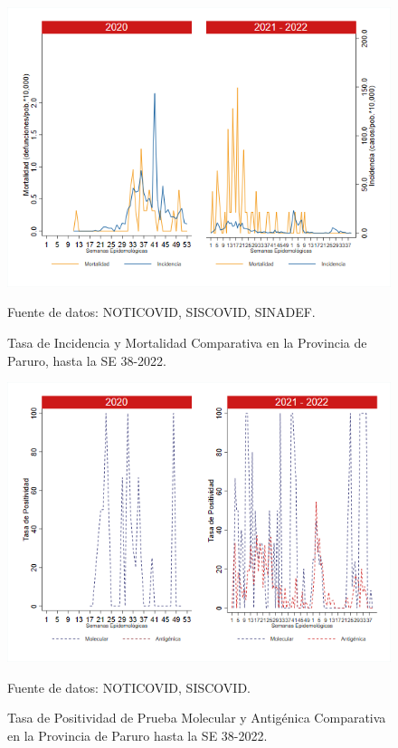 \documentclass[12pt,a4paper,openany]{book}
\begin{document}
	\begin{figure}[h]
		\caption{Tasa de Incidencia y Mortalidad Comparativa en la Provincia de Paruro, hasta la SE 38-2022.}\label{fig:inc_mort_paruro}
		\begin{center}
			\includegraphics[width=0.85\linewidth]{../figuras/incidencia_mortalidad_20_21_10.png}
		\end{center}
		{\footnotesize {Fuente de datos: NOTICOVID, SISCOVID, SINADEF.}} 
	\end{figure}
	
	\begin{figure}[h]
		\caption{Tasa de Positividad de Prueba Molecular y Antigénica Comparativa en la Provincia de Paruro hasta la SE 38-2022.}\label{fig:positividad_paruro}
		\begin{center}
			\includegraphics[width=0.7\linewidth]{../figuras/positividad_20_21_10.png}
		\end{center}
		{\footnotesize {Fuente de datos: NOTICOVID, SISCOVID.}}
	\end{figure}
	
\end{document}
